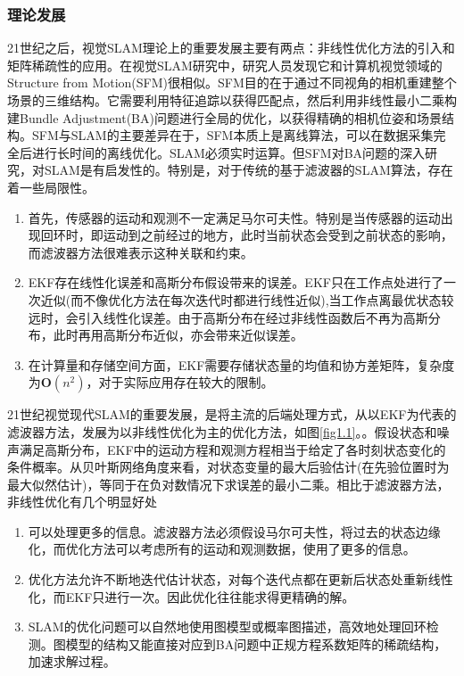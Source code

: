 \subsubsection*{理论发展}
21世纪之后，视觉SLAM理论上的重要发展主要有两点：非线性优化方法的引入和矩阵稀疏性的应用。在视觉SLAM研究中，研究人员发现它和计算机视觉领域的Structure from Motion(SFM)很相似。SFM目的在于通过不同视角的相机重建整个场景的三维结构。它需要利用特征追踪以获得匹配点，然后利用非线性最小二乘构建Bundle Adjustment(BA)问题进行全局的优化，以获得精确的相机位姿和场景结构\upcite{}。SFM与SLAM的主要差异在于，SFM本质上是离线算法，可以在数据采集完全后进行长时间的离线优化。SLAM必须实时运算。但SFM对BA问题的深入研究\upcite{}，对SLAM是有启发性的。特别是，对于传统的基于滤波器的SLAM算法，存在着一些局限性。
\begin{enumerate}[label={(\arabic*)}]
\item 首先，传感器的运动和观测不一定满足马尔可夫性。特别是当传感器的运动出现回环时，即运动到之前经过的地方，此时当前状态会受到之前状态的影响，而滤波器方法很难表示这种关联和约束。
\item EKF存在线性化误差和高斯分布假设带来的误差。EKF只在工作点处进行了一次近似(而不像优化方法在每次迭代时都进行线性近似),当工作点离最优状态较远时，会引入线性化误差。由于高斯分布在经过非线性函数后不再为高斯分布，此时再用高斯分布近似，亦会带来近似误差。
\item 在计算量和存储空间方面，EKF需要存储状态量的均值和协方差矩阵，复杂度为$\boldsymbol{O}(n^2)$，对于实际应用存在较大的限制。
\end{enumerate}

21世纪视觉现代SLAM的重要发展，是将主流的后端处理方式，从以EKF为代表的滤波器方法，发展为以非线性优化为主的优化方法，如图\ref{fig1.1}。。假设状态和噪声满足高斯分布，EKF中的运动方程和观测方程相当于给定了各时刻状态变化的条件概率。从贝叶斯网络角度来看，对状态变量的最大后验估计(在先验位置时为最大似然估计)，等同于在负对数情况下求误差的最小二乘\upcite{}。相比于滤波器方法，非线性优化有几个明显好处
\begin{enumerate}[label={(\arabic*)}]
\item 可以处理更多的信息。滤波器方法必须假设马尔可夫性，将过去的状态边缘化，而优化方法可以考虑所有的运动和观测数据，使用了更多的信息。
\item 优化方法允许不断地迭代估计状态，对每个迭代点都在更新后状态处重新线性化，而EKF只进行一次。因此优化往往能求得更精确的解。
\item SLAM的优化问题可以自然地使用图模型或概率图描述，高效地处理回环检测。图模型的结构又能直接对应到BA问题中正规方程系数矩阵的稀疏结构，加速求解过程。
\end{enumerate}

